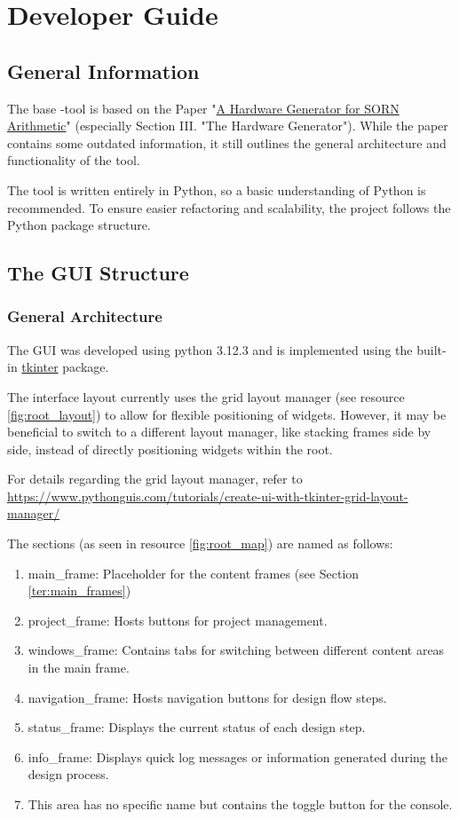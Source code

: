 \documentclass{article}
\begin{document}
\newpage
\section{Developer Guide}
\label{sec:developer_guide}

\subsection{General Information}
The base \ProjectName-tool is based on the Paper "\href{https://www.researchgate.net/publication/340244525_A_Hardware_Generator_for_SORN_Arithmetic}{A Hardware Generator for SORN Arithmetic}" (especially Section III. "The Hardware Generator"). While the paper contains some outdated information, it still outlines the general architecture and functionality of the tool.

The tool is written entirely in Python, so a basic understanding of Python is recommended. To ensure easier refactoring and scalability, the project follows the Python package structure.
\subsection{The GUI Structure}
\subsubsection{General Architecture}
\label{ter:general_architecture}
The GUI was developed using python 3.12.3 and is implemented using the built-in \href{https://docs.python.org/3/library/tkinter.html}{tkinter} package.

The interface layout currently uses the grid layout manager (see resource \ref{fig:root_layout}) to allow for flexible positioning of widgets. However, it may be beneficial to switch to a different layout manager, like stacking frames side by side, instead of directly positioning widgets within the root.

For details regarding the grid layout manager, refer to \url{https://www.pythonguis.com/tutorials/create-ui-with-tkinter-grid-layout-manager/}

The sections (as seen in resource \ref{fig:root_map}) are named as follows:

\label{enum:root_map}
\begin{enumerate}
    \item main\_frame: Placeholder for the content frames (see Section \ref{ter:main_frames})
    \item project\_frame: Hosts buttons for project management.
    \item windows\_frame: Contains tabs for switching between different content areas in the main frame.
    \item navigation\_frame: Hosts navigation buttons for design flow steps.
    \item status\_frame: Displays the current status of each design step.
    \item info\_frame: Displays quick log messages or information generated during the design process.
    \item This area has no specific name but contains the toggle button for the console.
\end{enumerate}
\end{document}
